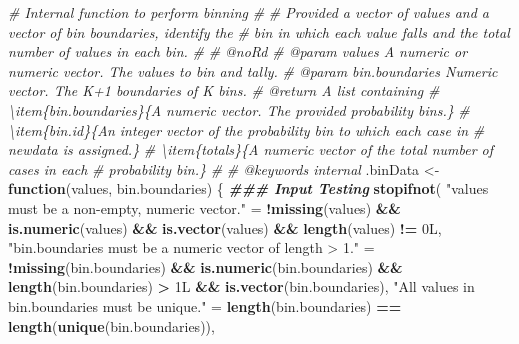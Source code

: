 \documentclass[
]{book}
\newenvironment{Shaded}{\begin{snugshade}}{\end{snugshade}}
\newcommand{\CommentTok}[1]{\textcolor[rgb]{0.56,0.35,0.01}{\textit{#1}}}
\newcommand{\ControlFlowTok}[1]{\textcolor[rgb]{0.13,0.29,0.53}{\textbf{#1}}}
\newcommand{\DocumentationTok}[1]{\textcolor[rgb]{0.56,0.35,0.01}{\textbf{\textit{#1}}}}
\newcommand{\FunctionTok}[1]{\textcolor[rgb]{0.13,0.29,0.53}{\textbf{#1}}}
\newcommand{\NormalTok}[1]{#1}
\newcommand{\OtherTok}[1]{\textcolor[rgb]{0.56,0.35,0.01}{#1}}
\newcommand{\SpecialCharTok}[1]{\textcolor[rgb]{0.81,0.36,0.00}{\textbf{#1}}}
\newcommand{\StringTok}[1]{\textcolor[rgb]{0.31,0.60,0.02}{#1}}
\begin{document}
\begin{Shaded}
\begin{Highlighting}[]
\CommentTok{\#\textquotesingle{} Internal function to perform binning}
\CommentTok{\#\textquotesingle{} }
\CommentTok{\#\textquotesingle{} Provided a vector of values and a vector of bin boundaries, identify the }
\CommentTok{\#\textquotesingle{}   bin in which each value falls and the total number of values in each bin.}
\CommentTok{\#\textquotesingle{}}
\CommentTok{\#\textquotesingle{} @noRd}
\CommentTok{\#\textquotesingle{} @param values A numeric or numeric vector. The values to bin and tally.}
\CommentTok{\#\textquotesingle{} @param bin.boundaries Numeric vector. The K+1 boundaries of K bins.}
\CommentTok{\#\textquotesingle{} @return A list containing}
\CommentTok{\#\textquotesingle{} \textbackslash{}item\{bin.boundaries\}\{A numeric vector. The provided probability bins.\}}
\CommentTok{\#\textquotesingle{} \textbackslash{}item\{bin.id\}\{An integer vector of the probability bin to which each case in }
\CommentTok{\#\textquotesingle{}   \textasciigrave{}newdata\textasciigrave{} is assigned.\}}
\CommentTok{\#\textquotesingle{} \textbackslash{}item\{totals\}\{A numeric vector of the total number of cases in each }
\CommentTok{\#\textquotesingle{}   probability bin.\}}
\CommentTok{\#\textquotesingle{} }
\CommentTok{\#\textquotesingle{} @keywords internal}
\NormalTok{.binData }\OtherTok{\textless{}{-}} \ControlFlowTok{function}\NormalTok{(values, bin.boundaries) \{}
  \DocumentationTok{\#\#\# Input Testing}
  \FunctionTok{stopifnot}\NormalTok{(}
    \StringTok{"\textasciigrave{}values\textasciigrave{} must be a non{-}empty, numeric vector."} \OtherTok{=} 
      \SpecialCharTok{!}\FunctionTok{missing}\NormalTok{(values) }\SpecialCharTok{\&\&} \FunctionTok{is.numeric}\NormalTok{(values) }\SpecialCharTok{\&\&} \FunctionTok{is.vector}\NormalTok{(values) }\SpecialCharTok{\&\&}
        \FunctionTok{length}\NormalTok{(values) }\SpecialCharTok{!=}\NormalTok{ 0L,}
    \StringTok{"\textasciigrave{}bin.boundaries\textasciigrave{} must be a numeric vector of length \textgreater{} 1."} \OtherTok{=} 
      \SpecialCharTok{!}\FunctionTok{missing}\NormalTok{(bin.boundaries) }\SpecialCharTok{\&\&} \FunctionTok{is.numeric}\NormalTok{(bin.boundaries) }\SpecialCharTok{\&\&} 
      \FunctionTok{length}\NormalTok{(bin.boundaries) }\SpecialCharTok{\textgreater{}}\NormalTok{ 1L }\SpecialCharTok{\&\&} \FunctionTok{is.vector}\NormalTok{(bin.boundaries),}
    \StringTok{"All values in \textasciigrave{}bin.boundaries\textasciigrave{} must be unique."} \OtherTok{=} 
      \FunctionTok{length}\NormalTok{(bin.boundaries) }\SpecialCharTok{==} \FunctionTok{length}\NormalTok{(}\FunctionTok{unique}\NormalTok{(bin.boundaries)),}

\end{Highlighting}
\end{Shaded}
\end{document}
